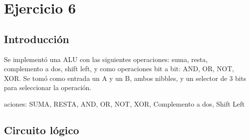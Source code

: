\section{Ejercicio 6}
\subsection{Introducción}

Se implementó una ALU con las siguientes operaciones: suma, resta, complemento a dos, shift left, y como operaciones bit a bit: AND, OR, NOT, XOR.
Se tomó como entrada un A y un B, ambos nibbles, y un selector de 3 bits para seleccionar la operación.

aciones: SUMA, RESTA, AND, OR, NOT, XOR, Complemento a dos, Shift Left
\subsection{Circuito lógico}
